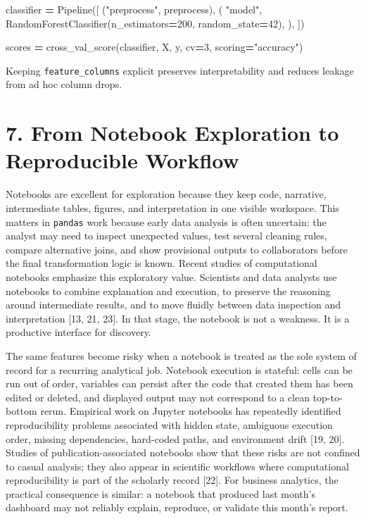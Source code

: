 \documentclass[
  12pt,
]{article}
\newenvironment{Shaded}{\begin{snugshade}}{\end{snugshade}}
\newcommand{\DecValTok}[1]{\textcolor[rgb]{0.00,0.00,0.81}{#1}}
\newcommand{\NormalTok}[1]{#1}
\newcommand{\OperatorTok}[1]{\textcolor[rgb]{0.81,0.36,0.00}{\textbf{#1}}}
\newcommand{\StringTok}[1]{\textcolor[rgb]{0.31,0.60,0.02}{#1}}
\begin{document}
\begin{Shaded}
\begin{Highlighting}[]
\NormalTok{classifier }\OperatorTok{=}\NormalTok{ Pipeline([}
\NormalTok{    (}\StringTok{"preprocess"}\NormalTok{, preprocess),}
\NormalTok{    (}
        \StringTok{"model"}\NormalTok{,}
\NormalTok{        RandomForestClassifier(n\_estimators}\OperatorTok{=}\DecValTok{200}\NormalTok{, random\_state}\OperatorTok{=}\DecValTok{42}\NormalTok{),}
\NormalTok{    ),}
\NormalTok{])}

\NormalTok{scores }\OperatorTok{=}\NormalTok{ cross\_val\_score(classifier, X, y, cv}\OperatorTok{=}\DecValTok{3}\NormalTok{, scoring}\OperatorTok{=}\StringTok{"accuracy"}\NormalTok{)}
\end{Highlighting}
\end{Shaded}

Keeping \texttt{feature\_columns} explicit preserves interpretability
and reduces leakage from ad hoc column drops.

\section{7. From Notebook Exploration to Reproducible
Workflow}\label{from-notebook-exploration-to-reproducible-workflow}

Notebooks are excellent for exploration because they keep code,
narrative, intermediate tables, figures, and interpretation in one
visible workspace. This matters in \texttt{pandas} work because early
data analysis is often uncertain: the analyst may need to inspect
unexpected values, test several cleaning rules, compare alternative
joins, and show provisional outputs to collaborators before the final
transformation logic is known. Recent studies of computational notebooks
emphasize this exploratory value. Scientists and data analysts use
notebooks to combine explanation and execution, to preserve the
reasoning around intermediate results, and to move fluidly between data
inspection and interpretation {[}13, 21, 23{]}. In that stage, the
notebook is not a weakness. It is a productive interface for discovery.

The same features become risky when a notebook is treated as the sole
system of record for a recurring analytical job. Notebook execution is
stateful: cells can be run out of order, variables can persist after the
code that created them has been edited or deleted, and displayed output
may not correspond to a clean top-to-bottom rerun. Empirical work on
Jupyter notebooks has repeatedly identified reproducibility problems
associated with hidden state, ambiguous execution order, missing
dependencies, hard-coded paths, and environment drift {[}19, 20{]}.
Studies of publication-associated notebooks show that these risks are
not confined to casual analysis; they also appear in scientific
workflows where computational reproducibility is part of the scholarly
record {[}22{]}. For business analytics, the practical consequence is
similar: a notebook that produced last month's dashboard may not
reliably explain, reproduce, or validate this month's report.
\end{document}
